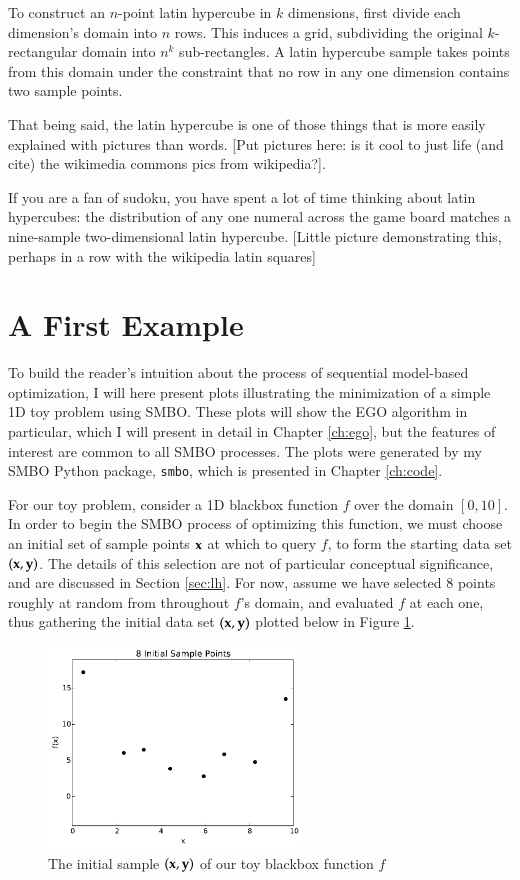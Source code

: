 To construct an $n$-point latin hypercube in $k$ dimensions, first divide each dimension's domain into $n$ rows. This induces a grid, subdividing the original $k$-rectangular domain into $n^k$ sub-rectangles. A latin hypercube sample takes points from this domain under the constraint that no row in any one dimension contains two sample points.

That being said, the latin hypercube is one of those things that is more easily explained with pictures than words. [Put pictures here: is it cool to just life (and cite) the wikimedia commons pics from wikipedia?].

If you are a fan of sudoku, you have spent a lot of time thinking about latin hypercubes: the distribution of any one numeral across the game board matches a nine-sample two-dimensional latin hypercube. [Little picture demonstrating this, perhaps in a row with the wikipedia latin squares]


\section{A First Example}\label{sec:smbo_ex}

To build the reader's intuition about the process of sequential model-based optimization, I will here present plots illustrating the minimization of a simple 1D toy problem using SMBO. These plots will show the EGO algorithm in particular, which I will present in detail in Chapter \ref{ch:ego}, but the features of interest are common to all SMBO processes. The plots were generated by my SMBO Python package, \texttt{smbo}, which is presented in Chapter \ref{ch:code}.

For our toy problem, consider a 1D blackbox function $f$ over the domain $[0,10]$. In order to begin the SMBO process of optimizing this function, we must choose an initial set of sample points $\mathbf{x}$ at which to query $f$, to form the starting data set $(\mathbf{x},\mathbf{y})$. The details of this selection are not of particular conceptual significance, and are discussed in Section \ref{sec:lh}. For now, assume we have selected 8 points roughly at random from throughout $f$'s domain, and evaluated $f$ at each one, thus gathering the initial data set $(\mathbf{x},\mathbf{y})$ plotted below in Figure \ref{fig:samp_data}.

\begin{figure}[h]
\centering
\includegraphics[width=0.6\textwidth]{images/ego_ex/just_points}
\caption{The initial sample $(\mathbf{x},\mathbf{y})$ of our toy blackbox function $f$}
\label{fig:samp_data}
\end{figure}

